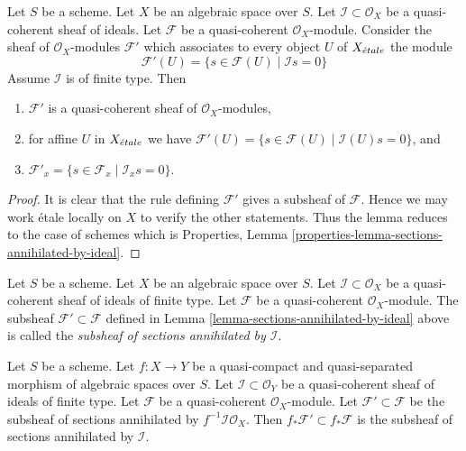 \begin{lemma}
\label{lemma-sections-annihilated-by-ideal}
Let $S$ be a scheme. Let $X$ be an algebraic space over $S$.
Let $\mathcal{I} \subset \mathcal{O}_X$ be a quasi-coherent sheaf of ideals.
Let $\mathcal{F}$ be a quasi-coherent $\mathcal{O}_X$-module.
Consider the sheaf of $\mathcal{O}_X$-modules $\mathcal{F}'$
which associates to every object $U$ of $X_{\acute{e}tale}$ the module
$$
\mathcal{F}'(U)
=
\{s \in \mathcal{F}(U) \mid
\mathcal{I}s = 0\}
$$
Assume $\mathcal{I}$ is of finite type. Then
\begin{enumerate}
\item $\mathcal{F}'$ is a quasi-coherent sheaf of $\mathcal{O}_X$-modules,
\item for affine $U$ in $X_{\acute{e}tale}$ we have
$\mathcal{F}'(U) = \{s \in \mathcal{F}(U) \mid \mathcal{I}(U)s = 0\}$, and
\item $\mathcal{F}'_x = \{s \in \mathcal{F}_x \mid \mathcal{I}_x s = 0\}$.
\end{enumerate}
\end{lemma}

\begin{proof}
It is clear that the rule defining $\mathcal{F}'$ gives a subsheaf
of $\mathcal{F}$. Hence we may work \'etale locally on $X$ to verify
the other statements. Thus the lemma reduces to the case of schemes
which is
Properties, Lemma \ref{properties-lemma-sections-annihilated-by-ideal}.
\end{proof}

\begin{definition}
\label{definition-subsheaf-sections-annihilated-by-ideal}
Let $S$ be a scheme. Let $X$ be an algebraic space over $S$.
Let $\mathcal{I} \subset \mathcal{O}_X$ be a quasi-coherent
sheaf of ideals of finite type.
Let $\mathcal{F}$ be a quasi-coherent $\mathcal{O}_X$-module.
The subsheaf $\mathcal{F}' \subset \mathcal{F}$ defined in
Lemma \ref{lemma-sections-annihilated-by-ideal} above is called
the {\it subsheaf of sections annihilated by $\mathcal{I}$}.
\end{definition}

\begin{lemma}
\label{lemma-push-sections-annihilated-by-ideal}
Let $S$ be a scheme.
Let $f : X \to Y$ be a quasi-compact and quasi-separated morphism
of algebraic spaces over $S$.
Let $\mathcal{I} \subset \mathcal{O}_Y$ be a quasi-coherent
sheaf of ideals of finite type. Let $\mathcal{F}$ be a quasi-coherent
$\mathcal{O}_X$-module. Let $\mathcal{F}' \subset \mathcal{F}$
be the subsheaf of sections annihilated by $f^{-1}\mathcal{I}\mathcal{O}_X$.
Then $f_*\mathcal{F}' \subset f_*\mathcal{F}$ is the subsheaf
of sections annihilated by $\mathcal{I}$.
\end{lemma}

